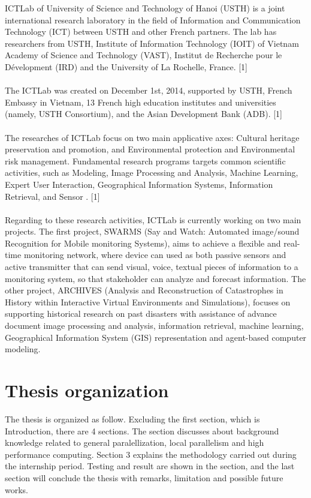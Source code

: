 ICTLab of University of Science and Technology of Hanoi (USTH) is a joint international research laboratory in the field of Information and Communication Technology (ICT) between USTH and other French partners. The lab has researchers from USTH, Institute of Information Technology (IOIT) of Vietnam Academy of Science and Technology (VAST), Institut de Recherche pour le Dévelopment (IRD) and the University of La Rochelle, France. [1] \\
~\\
The ICTLab was created on December 1st, 2014, supported by USTH, French Embassy in Vietnam, 13 French high education institutes and universities (namely, USTH Consortium), and the Asian Development Bank (ADB). [1] \\
~\\
The researches of ICTLab focus on two main applicative axes: Cultural heritage preservation and promotion, and Environmental protection and Environmental risk management. Fundamental research programs targets common scientific activities, such as Modeling, Image Processing and Analysis, Machine Learning, Expert User Interaction, Geographical Information Systems, Information Retrieval, and Sensor . [1] \\
~\\
Regarding to these research activities, ICTLab is currently working on two main projects. The first project, SWARMS (Say and Watch: Automated image/sound Recognition for Mobile monitoring Systems), aims to achieve a flexible and real-time monitoring network, where device can used as both passive sensors and active transmitter that can send visual, voice, textual pieces of information to a monitoring system, so that stakeholder can analyze and forecast information. The other project, ARCHIVES (Analysis and Reconstruction of Catastrophes in History within Interactive Virtual Environments and Simulations), focuses on supporting historical research on past disasters with assistance of advance document image processing and analysis, information retrieval, machine learning, Geographical Information System (GIS) representation and agent-based computer modeling. \\

\section{Thesis organization}

The thesis is organized as follow. Excluding the first section, which is Introduction, there are 4 sections. The  section discusses about background knowledge related to general paralellization, local parallelism and high performance computing. Section 3 explains the methodology carried out during the internship period. Testing and result are shown in the  section, and the last section will conclude the thesis with remarks, limitation and possible future works. 
